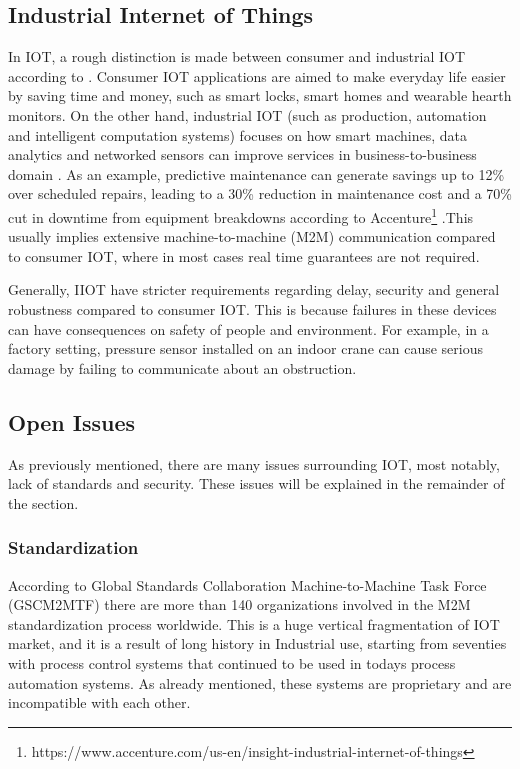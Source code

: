 \subsection{Industrial Internet of Things}

In IOT, a rough distinction is made between consumer and industrial IOT according to \cite{Bandyopadhyay2011}. Consumer IOT applications are aimed to make everyday life easier by saving time and money, such as smart locks, smart homes and wearable hearth monitors. On the other hand, industrial IOT (such as production, automation and intelligent computation systems) focuses on how smart machines, data analytics and networked sensors can improve services in business-to-business domain 
\cite{Palattella2016}. As an example, predictive maintenance can generate savings up to 12\% over scheduled repairs, leading to a 30\% reduction in maintenance cost and a 70\% cut in downtime from equipment breakdowns according to Accenture\footnote{https://www.accenture.com/us-en/insight-industrial-internet-of-things} .This usually implies extensive machine-to-machine (M2M) communication compared to consumer IOT, where in most cases real time guarantees are not required.

Generally, IIOT have stricter requirements regarding delay, security and general robustness compared to consumer IOT. This is because failures in these devices can have consequences on safety of people and environment. For example, in a factory setting, pressure sensor installed on an indoor crane can cause serious damage by failing to communicate about an obstruction.

\subsection{Open Issues}
\label{section:OpenIssues}
As previously mentioned, there are many issues surrounding IOT, most notably, lack of standards and security. These issues will be explained in the remainder of the section.

\subsubsection{Standardization}
\label{section:Standardization}

According to Global Standards Collaboration Machine-to-Machine Task Force (GSCM2MTF) there are more than 140 organizations involved in the M2M standardization process worldwide.  
This is a huge vertical fragmentation of IOT market, and it is a result of long history in Industrial use, starting from seventies with process control systems that continued to be used in todays process automation systems. As already mentioned, these systems are proprietary and are incompatible with each other.

